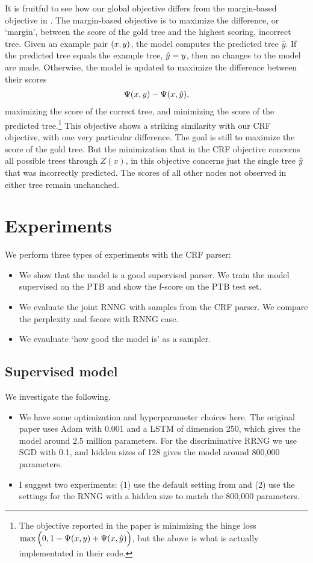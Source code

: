 It is fruitful to see how our global objective differs from the margin-based objective in \citep{stern2017minimal}. The margin-based objective is to maximize the difference, or `margin', between the score of the gold tree and the highest scoring, incorrect tree. Given an example pair $(x, y)$, the model computes the predicted tree $\hat{y}$. If the predicted tree equals the example tree, $\hat{y} = y$, then no changes to the model are made. Otherwise, the model is updated to maximize the difference between their scores
\begin{align*}
  \Psi(x, y) - \Psi(x, \hat{y}),
\end{align*}
maximizing the score of the correct tree, and minimizing the score of the predicted tree.\footnote{The objective reported in the paper is minimizing the hinge loss $\max \Big(0, 1 - \Psi(x, y) + \Psi(x, \hat{y}) \Big)$, but the above is what is actually implementated in their code.} This objective shows a striking similarity with our CRF objective, with one very particular difference. The goal is still to maximize the score of the gold tree. But the minimization that in the CRF objective concerns all possible trees through $Z(x)$, in this objective concerns just the single tree $\hat{y}$ that was incorrectly predicted. The scores of all other nodes not observed in either tree remain unchanched.

\section{Experiments}
  We perform three types of experiments with the CRF parser:
  \begin{itemize}
    \item We show that the model is a good supervised parser. We train the model supervised on the PTB and show the f-score on the PTB test set.
    \item We evaluate the joint RNNG with samples from the CRF parser. We compare the perplexity and fscore with RNNG case.
    \item We evauluate `how good the model is' as a sampler.
  \end{itemize}

\subsection{Supervised model}
  We investigate the following.
  \begin{itemize}
    \item We have some optimization and hyperparameter choices here. The original paper uses Adam with 0.001 and a LSTM of dimension 250, which gives the model around 2.5 million parameters. For the discriminative RRNG we use SGD with 0.1, and hidden sizes of 128 gives the model around 800,000 parameters.
    \item I suggest two experiments: (1) use the default setting from \citep{stern2017minimal} and (2) use the settings for the RNNG with a hidden size to match the 800,000 parameters.
  \end{itemize}

